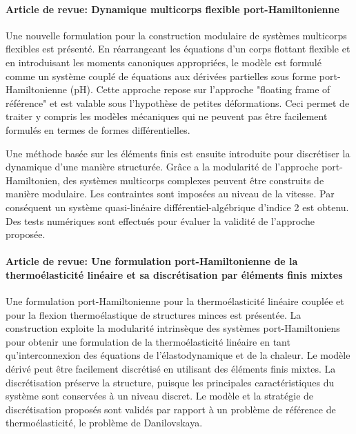\documentclass[french]{article}
\begin{document}
\paragraph{Article de revue: Dynamique multicorps flexible port-Hamiltonienne \cite{brugnoli2020msd} \\}

Une nouvelle formulation pour la construction modulaire de systèmes multicorps flexibles est présenté. En réarrangeant les équations d'un corps flottant flexible et en introduisant les moments canoniques appropriées, le modèle est formulé comme un système couplé de équations aux dérivées partielles sous forme port-Hamiltonienne (pH). Cette approche repose sur l'approche "floating frame of référence" et est valable sous l'hypothèse de petites déformations. Ceci permet de traiter y compris les modèles mécaniques qui ne peuvent pas être facilement formulés en termes de formes différentielles.

Une méthode basée sur les éléments finis est ensuite introduite pour discrétiser la dynamique d'une manière structurée. Grâce a la modularité de l'approche port-Hamiltonien, des systèmes multicorps complexes peuvent être construits de manière modulaire. Les contraintes sont imposées au niveau de la vitesse. Par conséquent un système quasi-linéaire différentiel-algébrique d'indice 2 est obtenu. Des tests numériques sont effectués pour évaluer la validité de l'approche proposée.

\paragraph{Article de revue: Une formulation port-Hamiltonienne de la thermoélasticité linéaire et sa discrétisation par éléments finis mixtes \cite{brugnoli2021ther} \\}

Une formulation port-Hamiltonienne pour la thermoélasticité linéaire couplée et pour la flexion thermoélastique de structures minces est présentée. La construction exploite la modularité intrinsèque des systèmes port-Hamiltoniens pour obtenir une formulation de la thermoélasticité linéaire en tant qu'interconnexion des équations de l'élastodynamique et de la chaleur. Le modèle dérivé peut être facilement discrétisé en utilisant des éléments finis mixtes. La discrétisation préserve la structure, puisque les principales caractéristiques du système sont conservées à un niveau discret. Le modèle et la stratégie de discrétisation proposés sont validés par rapport à un problème de référence de thermoélasticité, le problème de Danilovskaya.
\end{document}
